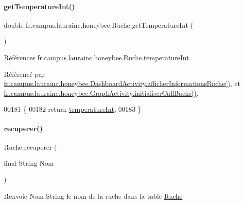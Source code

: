\paragraph{\texorpdfstring{get\+Temperature\+Int()}{getTemperatureInt()}}
{\footnotesize\ttfamily double fr.\+campus.\+laurainc.\+honeybee.\+Ruche.\+get\+Temperature\+Int (\begin{DoxyParamCaption}{ }\end{DoxyParamCaption})}



Références \hyperlink{classfr_1_1campus_1_1laurainc_1_1honeybee_1_1_ruche_aa8c8bbb640a5e445ca1d67f97e0f99b0}{fr.\+campus.\+laurainc.\+honeybee.\+Ruche.\+temperature\+Int}.



Référencé par \hyperlink{classfr_1_1campus_1_1laurainc_1_1honeybee_1_1_dashboard_activity_a88f00531bee33bd6c47b33f5ac4df9ed}{fr.\+campus.\+laurainc.\+honeybee.\+Dashboard\+Activity.\+afficher\+Informations\+Ruche()}, et \hyperlink{classfr_1_1campus_1_1laurainc_1_1honeybee_1_1_graph_activity_a8dc56c3e0744bcb9295ad10e726b5fdb}{fr.\+campus.\+laurainc.\+honeybee.\+Graph\+Activity.\+initialiser\+Call\+Backs()}.


\begin{DoxyCode}
00181                                       \{
00182         \textcolor{keywordflow}{return} \hyperlink{classfr_1_1campus_1_1laurainc_1_1honeybee_1_1_ruche_aa8c8bbb640a5e445ca1d67f97e0f99b0}{temperatureInt};
00183     \}
\end{DoxyCode}
\mbox{\label{classfr_1_1campus_1_1laurainc_1_1honeybee_1_1_ruche_a7a99d3c585f2c507eb2c6c265a5bb1fe}} 
\paragraph{\texorpdfstring{recuperer()}{recuperer()}}
{\footnotesize\ttfamily Ruche.\+recuperer (\begin{DoxyParamCaption}\item[{final String}]{Nom }\end{DoxyParamCaption})}

\begin{DoxyReturn}{Renvoie}
Nom String le nom de la ruche dans la table \hyperlink{classfr_1_1campus_1_1laurainc_1_1honeybee_1_1_ruche}{Ruche} 
\end{DoxyReturn}


